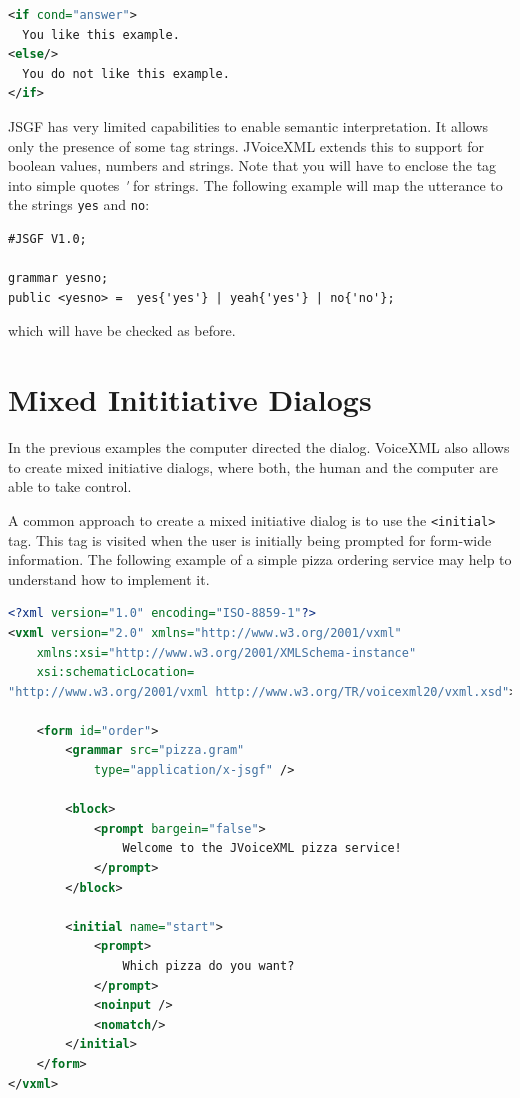 \documentclass[11pt,a4paper]{article}
\begin{document}
\begin{lstlisting}[language=XML]
<if cond="answer">
  You like this example.
<else/>
  You do not like this example.
</if>
\end{lstlisting}

JSGF has very limited capabilities to enable semantic interpretation.
It allows only the presence of some tag strings. JVoiceXML extends this to
support for boolean values, numbers and strings. Note that you will have to enclose the tag into simple quotes \emph{\'} for strings.
The following example will map the utterance to the strings \lstinline{yes}
and \lstinline{no}:
\begin{lstlisting}
#JSGF V1.0;

grammar yesno;
public <yesno> =  yes{'yes'} | yeah{'yes'} | no{'no'};
\end{lstlisting}
which will have be checked as before.

\section{Mixed Inititiative Dialogs}

In the previous examples the computer directed the dialog. VoiceXML also allows
to create mixed initiative dialogs, where both, the human and the computer
are able to take control.

A common approach to create a mixed initiative dialog is to use the
\lstinline{<initial>} tag.
This tag is visited when the user is initially being prompted for form-wide
information.
The following example of a simple pizza ordering service may help to understand
how to implement it.

\begin{lstlisting}[language=XML]
<?xml version="1.0" encoding="ISO-8859-1"?>
<vxml version="2.0" xmlns="http://www.w3.org/2001/vxml"
    xmlns:xsi="http://www.w3.org/2001/XMLSchema-instance"
    xsi:schematicLocation=
"http://www.w3.org/2001/vxml http://www.w3.org/TR/voicexml20/vxml.xsd">

    <form id="order">
        <grammar src="pizza.gram"
            type="application/x-jsgf" />

        <block>
            <prompt bargein="false">
                Welcome to the JVoiceXML pizza service!
            </prompt>
        </block>

        <initial name="start">
            <prompt>
                Which pizza do you want?
            </prompt>
            <noinput />
            <nomatch/>
        </initial>
    </form>
</vxml>
\end{lstlisting}
\end{document}
